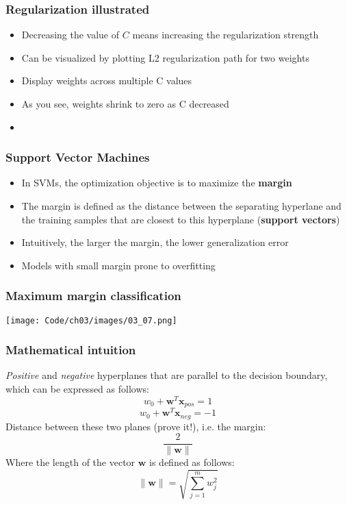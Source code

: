 \documentclass{beamer}
\begin{document}
\begin{frame}
  \frametitle{Regularization illustrated}
  \begin{itemize}
  \item Decreasing the value of $C$ means increasing the regularization strength
  \item Can be visualized by plotting L2 regularization path for two weights
  \item Display weights across multiple C values
  \item As you see, weights shrink to zero as C decreased
  \item \href{https://github.com/rasbt/python-machine-learning-book/blob/master/code/ch03/ch03.ipynb}{}
  \end{itemize}
\end{frame}

\begin{frame}
  \frametitle{Support Vector Machines}
  \begin{itemize}
  \item In SVMs, the optimization objective is to maximize the \textbf{margin}
  \item The margin is defined as the distance between the separating hyperlane and the training samples that are closest to this hyperplane (\textbf{support vectors})
  \item Intuitively, the larger the margin, the lower generalization error
  \item Models with small margin prone to overfitting
  \end{itemize}
\end{frame}

\begin{frame}
  \frametitle{Maximum margin classification}
  \texttt{[image: Code/ch03/images/03\_07.png]}
\end{frame}

\begin{frame}
  \frametitle{Mathematical intuition}
  \textit{Positive} and \textit{negative} hyperplanes that are parallel to the decision boundary, which can be expressed as follows:
  \[
  w_0 + \mathbf{w}^T \mathbf{x}_{pos} = 1
  \]
  \[
  w_0 + \mathbf{w}^T \mathbf{x}_{neg} = -1
  \]
  Distance between these two planes (prove it!), i.e. the margin:
  \[
  \frac{2}{\lVert \mathbf{w} \rVert}
  \]
  Where the length of the vector $\mathbf{w}$ is defined as follows:
  \[
  \lVert \mathbf{w} \rVert = \sqrt{\sum_{j=1}^{m} w_{j}^{2}}
  \]
\end{frame}
\end{document}
